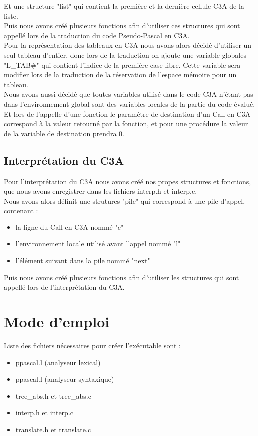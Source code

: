 \documentclass{report}
\begin{document}
Et une structure "list" qui contient la première et la dernière cellule C3A de la liste.\\

Puis nous avons créé plusieurs fonctions afin d'utiliser ces structures qui sont appellé lors de la traduction du code Pseudo-Pascal en C3A.\\

Pour la représentation des tableaux en C3A nous avons alors décidé d'utiliser un seul tableau d'entier, donc lors de la traduction on ajoute une variable globales "L\_TAB\#" qui contient l'indice de la première case libre. Cette variable sera modifier lors de la traduction de la réservation de l'espace mémoire pour un tableau.\\

Nous avons aussi décidé que toutes variables utilisé dans le code C3A n'étant pas dans l'environnement global sont des variables locales de la partie du code évalué.\\

Et lors de l'appelle d'une fonction le paramètre de destination d'un Call en C3A correspond à la valeur retourné par la fonction, et pour une procédure la valeur de la variable de destination prendra 0.

\subsection{Interprétation du C3A}
Pour l'interprétation du C3A nous avons créé nos propes structures et fonctions, que nous avons enregistrer dans les fichiers interp.h et interp.c.\\

Nous avons alors définit une strutures "pile" qui correspond à une pile d'appel, contenant :
\begin{itemize}
\item la ligne du Call en C3A nommé "c"
\item l'environnement locale utilisé avant l'appel nommé "l"
\item l'élément suivant dans la pile nommé "next"
\end{itemize}
\bigskip

Puis nous avons créé plusieurs fonctions afin d'utiliser les structures qui sont appellé lors de l'interprétation du C3A.\\

\newpage
\section{Mode d'emploi}
Liste des fichiers nécessaires pour créer l'exécutable sont :
\begin{itemize}
\item ppascal.l (analyseur lexical)
\item ppascal.l (analyseur syntaxique)
\item tree\_abs.h et tree\_abs.c
\item interp.h et interp.c
\item translate.h et translate.c
\end{itemize}
\bigskip
\end{document}
